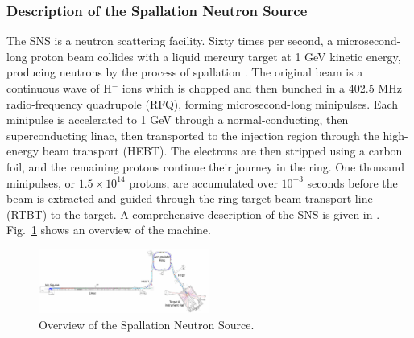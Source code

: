 \subsubsection{Description of the Spallation Neutron Source}

The SNS is a neutron scattering facility. Sixty times per second, a microsecond-long proton beam collides with a liquid mercury target at 1 GeV kinetic energy, producing neutrons by the process of spallation \cite{Russell1990}. The original beam is a continuous wave of H$^-$ ions which is chopped and then bunched in a 402.5 MHz radio-frequency quadrupole (RFQ), forming microsecond-long minipulses. Each minipulse is accelerated to 1 GeV through a normal-conducting, then superconducting linac, then transported to the injection region through the high-energy beam transport (HEBT). The electrons are then stripped using a carbon foil, and the remaining protons continue their journey in the ring. One thousand minipulses, or $1.5 \times 10^{14}$ protons, are accumulated over $10^{-3}$ seconds before the beam is extracted and guided through the ring-target beam transport line (RTBT) to the target. A comprehensive description of the SNS is given in \cite{Henderson2014}. Fig.~\ref{fig:SNS} shows an overview of the machine.
%
\begin{figure}[!p]
    \centering
    \includegraphics[angle=-90, width=0.5\textwidth]{Images/chapter1/SNS.png}
    \caption{Overview of the Spallation Neutron Source.}
    \label{fig:SNS}
\end{figure}
%

